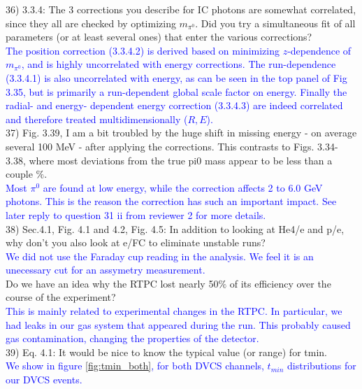 36) 3.3.4: The 3 corrections you describe for IC photons are somewhat 
correlated, since they all are checked by optimizing $m_{\pi^0}$. Did you try a 
simultaneous fit of all parameters (or at least several ones) that enter the 
various corrections?\\
\textcolor{blue}{The position correction (3.3.4.2) is derived based on minimizing
$z$-dependence of $m_{\pi^0}$, and is highly uncorrelated with energy 
corrections. The run-dependence (3.3.4.1) is also uncorrelated with energy, as
can be seen in the top panel of Fig 3.35, but is primarily a run-dependent global
scale factor on energy. Finally the radial- and energy- dependent energy correction
(3.3.4.3) are indeed correlated and therefore treated multidimensionally ($R,E$).}\\

37) Fig. 3.39, I am a bit troubled by the huge shift in missing energy - on 
average several 100 MeV - after applying the corrections. This contrasts to  
Figs. 3.34-3.38, where most deviations from the true pi0 mass appear to be less  
than a couple $\%$.\\
\textcolor{blue}{Most $\pi^0$ are found at low energy, while the correction affects
2 to 6.0 GeV photons. This is the reason the correction has such an important 
impact. See later reply to question 31 ii from reviewer 2 for more details.}\\

38) Sec.4.1, Fig. 4.1 and 4.2, Fig. 4.5: In addition to looking at He4/e and 
p/e, why don't you also look at e/FC to eliminate unstable runs?\\
\textcolor{blue}{We did not use the Faraday cup reading in the analysis. We
feel it is an unecessary cut for an assymetry measurement.}\\

Do we have an idea why the RTPC lost nearly 50$\%$ of its efficiency over the 
course of the experiment?\\
\textcolor{blue}{
 This is mainly related to experimental changes in the RTPC. In particular, we 
had leaks in our gas system that appeared during the run. This probably
caused gas contamination, changing the properties of the detector.}\\


39) Eq. 4.1: It would be nice to know the typical value (or range) for tmin.\\
\textcolor{blue}{We show in figure \ref{fig:tmin_both}, for both DVCS 
channels, $t_{min}$ distributions for our DVCS events.}\\

